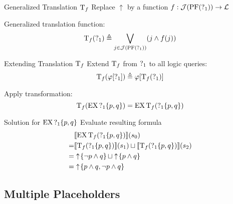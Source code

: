 \begin{frame}{Generalized Translation $\operatorname{T}_f$}
  Replace $\uparrow$ by a function $f : \mathcal{J}(\operatorname{PF}(\operatorname{?}_1)) \to \mathcal{L}$

  Generalized translation function:
  \[ 
    \operatorname{T}_f(\operatorname{?}_1) \triangleq \bigvee_{j\in\mathcal{J}(\operatorname{PF}(\operatorname{?}_1))} (j \land f(j))
  \]
\end{frame}

\begin{frame}{Extending Translation $\operatorname{T}_f$}
  Extend $\operatorname{T}_f$ from $\operatorname{?}_1$ to all logic queries:
  \[ 
    \operatorname{T}_f(\varphi[\operatorname{?}_1]) \triangleq \varphi[\operatorname{T}_f(\operatorname{?}_1)]
  \]
  
  \begin{example}
    Apply transformation:
    \[ \operatorname{T}_f(\operatorname{EX} \operatorname{?}_1\{p,q\}) = \operatorname{EX}\operatorname{T}_f( \operatorname{?}_1\{p,q\}) \]
  \end{example}
\end{frame}


\begin{frame}{Solution for $\operatorname{EX} \operatorname{?}_1\{p,q\}$}
  Evaluate resulting formula
  \begin{align*}
    & \llbracket \operatorname{EX} \operatorname{T}_f( \operatorname{?}_1\{p,q\}) \rrbracket (s_0) \\
      =& \llbracket \operatorname{T}_f( \operatorname{?}_1\{p,q\}) \rrbracket (s_1) \sqcup \llbracket \operatorname{T}_f( \operatorname{?}_1\{p,q\}) \rrbracket (s_2) \\
      =& \uparrow \! \left\{ \lnot p\land q \right\} \sqcup \uparrow \! \left\{ p\land q \right\} \\
      =& \uparrow \! \left\{ p\land q, \lnot p\land q \right\} 
  \end{align*}
\end{frame}

\subsection{Multiple Placeholders}%

